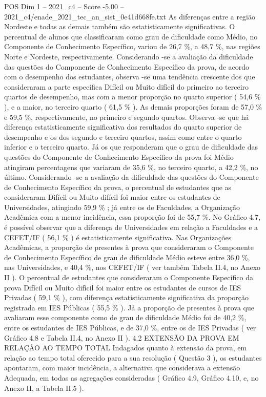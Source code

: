 \begin{textsample}{POS Dim 1 – 2021\_c4 – Score -5.00 – 2021\_c4/enade\_2021\_tec\_an\_sist\_0e41d668fe.txt}
As diferenças entre a região Nordeste e todas as demais também são estatisticamente significativas.
O percentual de alunos que classificaram como grau de dificuldade como Médio, no Componente de Conhecimento Específico, variou de 26,7 \%, a 48,7 \%, nas regiões Norte e Nordeste, respectivamente.
Considerando -se a avaliação da dificuldade das questões do Componente de Conhecimento Específico da prova, de acordo com o desempenho dos estudantes, observa -se uma tendência crescente dos que consideraram a parte específica Difícil ou Muito difícil do primeiro ao terceiro quartos de desempenho, mas com a menor proporção no quarto superior ( 54,6 \% ), e a maior, no terceiro quarto ( 61,5 \% ).
As demais proporções foram de 57,0 \% e 59,5 \%, respectivamente, no primeiro e segundo quartos.
Observa -se que há diferença estatisticamente significativa dos resultados do quarto superior de desempenho e os dos segundo e terceiro quartos, assim como entre o quarto inferior e o terceiro quarto.
Já os que responderam que o grau de dificuldade das questões do Componente de Conhecimento Específico da prova foi Médio atingiram percentagens que variaram de 35,6 \%, no terceiro quarto, a 42,2 \%, no último.
Considerando -se a avaliação da dificuldade das questões do Componente de Conhecimento Específico da prova, o percentual de estudantes que as consideraram Difícil ou Muito difícil foi maior entre os estudantes de Universidades, atingindo 59,9 \% ; já entre os de Faculdades, a Organização Acadêmica com a menor incidência, essa proporção foi de 55,7 \%.
No Gráfico 4.7, é possível observar que a diferença de Universidades em relação a Faculdades e a CEFET/IF ( 56,1 \% ) é estatisticamente significativa.
Nas Organizações Acadêmicas, a proporção de presentes à prova que consideraram o Componente de Conhecimento Específico de grau de dificuldade Médio esteve entre 36,0 \%, nas Universidades, e 40,4 \%, nos CEFET/IF ( ver também Tabela II.4, no Anexo II ).
O percentual de estudantes que consideraram o Componente Específico da prova Difícil ou Muito difícil foi maior entre os estudantes de cursos de IES Privadas ( 59,1 \% ), com diferença estatisticamente significativa da proporção registrada em IES Públicas ( 55,5 \% ).
Já a proporção de presentes à prova que avaliaram esse componente como de grau de dificuldade Médio foi de 40,2 \%, entre os estudantes de IES Públicas, e de 37,0 \%, entre os de IES Privadas ( ver Gráfico 4.8 e Tabela II.4, no Anexo II ). 4.2 EXTENSÃO DA PROVA EM RELAÇÃO AO TEMPO TOTAL Indagados quanto à extensão da prova, em relação ao tempo total oferecido para a sua resolução ( Questão 3 ), os estudantes apontaram, com maior incidência, a alternativa que considerava a extensão Adequada, em todas as agregações consideradas ( Gráfico 4.9, Gráfico 4.10, e, no Anexo II, a Tabela II.5 ).

\end{textsample}
